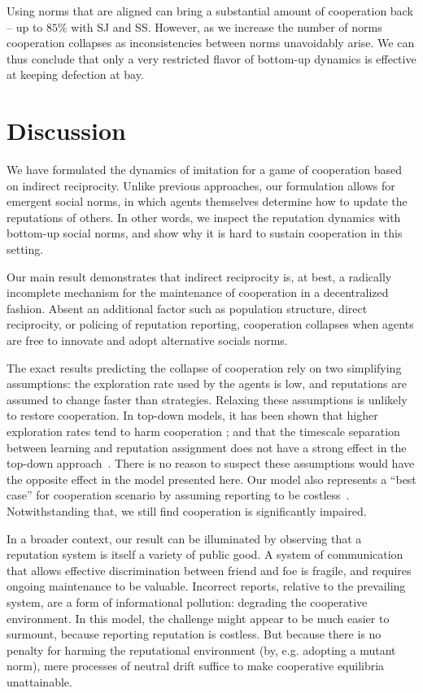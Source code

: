 \documentclass[sigconf]{aamas}  %
\begin{document}
Using norms that are aligned can bring a substantial amount of cooperation back -- up to $85\%$ with SJ and SS. However, as we increase the number of norms cooperation collapses as inconsistencies between norms unavoidably arise. We can thus conclude that only a very restricted flavor of bottom-up dynamics is effective at keeping defection at bay.  




 
\section{Discussion\label{discussion}}

We have formulated the dynamics of imitation for a game of cooperation based on indirect reciprocity. Unlike previous approaches, our formulation allows for emergent social norms, in which agents themselves determine how to update the reputations of others. In other words, we inspect the reputation dynamics with bottom-up social norms, and show why it is hard to sustain cooperation in this setting.

Our main result demonstrates that indirect reciprocity is, at best, a radically incomplete mechanism for the maintenance of cooperation in a decentralized fashion. Absent an additional factor such as population structure, direct reciprocity, or policing of reputation reporting, cooperation collapses when agents are free to innovate and adopt alternative socials norms.

The exact results predicting the collapse of cooperation rely on two simplifying assumptions: the exploration rate used by the agents is low, and reputations are assumed to change faster than strategies. Relaxing these assumptions is unlikely to restore cooperation. In top-down models, it has been shown that higher exploration rates tend to harm cooperation \cite{santos_evolution_2016}; and that the timescale separation between learning and reputation assignment does not have a strong effect in the top-down approach~\cite{Santos2016}. There is no reason to suspect these assumptions would have the opposite effect in the model presented here. Our model also represents a ``best case'' for cooperation scenario by assuming reporting to be costless~\cite{santos2018indirect}. Notwithstanding that, we still find cooperation is significantly impaired.

In a broader context, our result  can be illuminated by observing that a reputation system is itself a variety of public good. A system of communication that allows effective discrimination between friend and foe is fragile, and requires ongoing maintenance to be valuable. Incorrect reports, relative to the prevailing system, are a form of informational pollution: degrading the cooperative environment. In this model, the challenge might appear to be much easier to surmount, because reporting reputation is costless. But because there is no penalty for harming the reputational environment (by, e.g. adopting a mutant norm), mere processes of neutral drift suffice to make cooperative equilibria unattainable.
\end{document}
